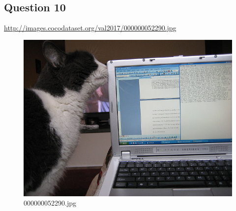 \subsection*{Question 10}
\url{http://images.cocodataset.org/val2017/000000052290.jpg}
    \begin{figure}[h]
        \centering
        \includegraphics[width=0.8\linewidth]{../image set/easy/000000052290.jpg}
        \caption{000000052290.jpg}
    \end{figure}
